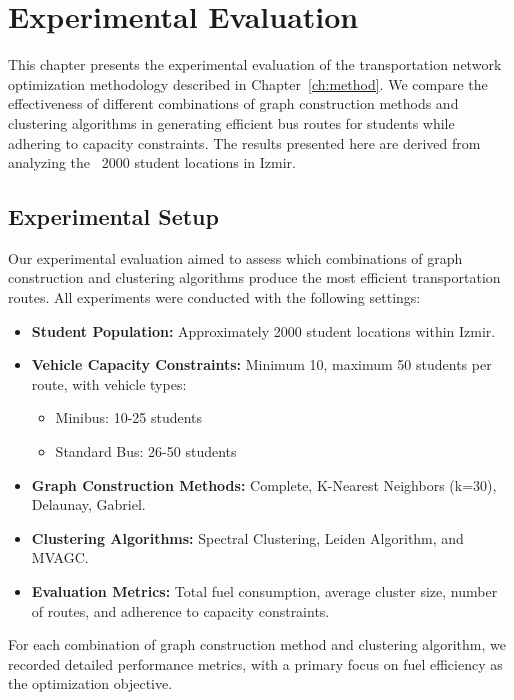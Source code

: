 \chapter{Experimental Evaluation}
\label{ch:experiments}

This chapter presents the experimental evaluation of the transportation network optimization methodology described in Chapter~\ref{ch:method}. We compare the effectiveness of different combinations of graph construction methods and clustering algorithms in generating efficient bus routes for students while adhering to capacity constraints. The results presented here are derived from analyzing the ~2000 student locations in Izmir.

\section{Experimental Setup}
\label{sec:exp_setup}

Our experimental evaluation aimed to assess which combinations of graph construction and clustering algorithms produce the most efficient transportation routes. All experiments were conducted with the following settings:

\begin{itemize}
    \item \textbf{Student Population:} Approximately 2000 student locations within Izmir.
    \item \textbf{Vehicle Capacity Constraints:} Minimum 10, maximum 50 students per route, with vehicle types:
    \begin{itemize}
        \item Minibus: 10-25 students
        \item Standard Bus: 26-50 students
    \end{itemize}
    \item \textbf{Graph Construction Methods:} Complete, K-Nearest Neighbors (k=30), Delaunay, Gabriel.
    \item \textbf{Clustering Algorithms:} Spectral Clustering, Leiden Algorithm, and MVAGC.
    \item \textbf{Evaluation Metrics:} Total fuel consumption, average cluster size, number of routes, and adherence to capacity constraints.
\end{itemize}

For each combination of graph construction method and clustering algorithm, we recorded detailed performance metrics, with a primary focus on fuel efficiency as the optimization objective.

